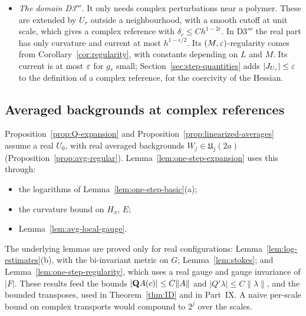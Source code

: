 \begin{itemize}
\item \emph{The domain D3$'''$.} It only needs complex perturbations near a polymer. These are extended by $U_r$ outside a neighbourhood, with a smooth cutoff at unit scale, which gives a complex reference with $\delta_c\le Ch^{1-2\epsilon}$. In D3$'''$ the real part has only curvature and current at most $h^{1-\epsilon/2}$. Its $(M,\varepsilon)$-regularity comes from Corollary~\ref{cor:regularity}, with constants depending on $L$ and $M$. Its current is at most $\varepsilon$ for $g_*$ small; Section~\ref{sec:step-quantities} adds $|J_{U_r}|\le\varepsilon$ to the definition of a complex reference, for the coercivity of the Hessian.
\end{itemize}

\subsection{Averaged backgrounds at complex references}\label{sec:AB-proof}

Proposition~\ref{prop:Q-expansion} and Proposition~\ref{prop:linearized-averages} assume a real $U_0$, with real averaged backgrounds $W_j\in\mathfrak U_j(2a)$ (Proposition~\ref{prop:avg-regular}). Lemma~\ref{lem:one-step-expansion} uses this through:
\begin{itemize}
\item the logarithms of Lemma~\ref{lem:one-step-basic}(a);
\item the curvature bound on $H_x$, $E$;
\item Lemma~\ref{lem:avg-local-gauge}.
\end{itemize}
The underlying lemmas are proved only for real configurations: Lemma~\ref{lem:log-estimates}(b), with the bi-invariant metric on $G$; Lemma~\ref{lem:stokes}; and Lemma~\ref{lem:one-step-regularity}, which uses a real gauge and gauge invariance of $|F|$. These results feed the bounds $|\mathbf Q A(c)|\le C\|A\|$ and $|Q'\lambda|\le C\|\lambda\|$, and the bounded transposes, used in Theorem~\ref{thm:ID} and in Part~IX. A naive per-scale bound on complex transports would compound to $2^{j}$ over the scales.

